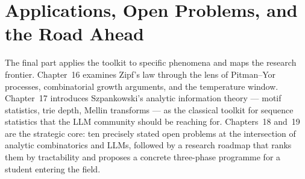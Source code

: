 \part{Applications, Open Problems, and the Road Ahead}

The final part applies the toolkit to specific phenomena and maps the research frontier. Chapter~16 examines Zipf's law through the lens of Pitman--Yor processes, combinatorial growth arguments, and the temperature window. Chapter~17 introduces Szpankowski's analytic information theory --- motif statistics, trie depth, Mellin transforms --- as the classical toolkit for sequence statistics that the LLM community should be reaching for. Chapters~18 and~19 are the strategic core: ten precisely stated open problems at the intersection of analytic combinatorics and LLMs, followed by a research roadmap that ranks them by tractability and proposes a concrete three-phase programme for a student entering the field.





